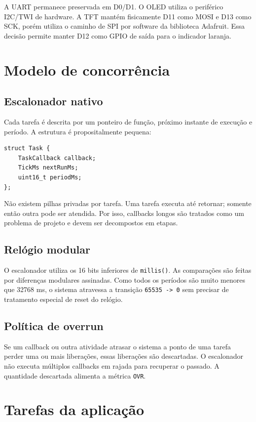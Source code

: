 \documentclass[12pt,a4paper]{article}
\begin{document}
A UART permanece preservada em D0/D1. O OLED utiliza o periférico I2C/TWI de
hardware. A TFT mantém fisicamente D11 como MOSI e D13 como SCK, porém utiliza o
caminho de SPI por software da biblioteca Adafruit. Essa decisão permite manter
D12 como GPIO de saída para o indicador laranja.

\section{Modelo de concorrência}

\subsection{Escalonador nativo}

Cada tarefa é descrita por um ponteiro de função, próximo instante de execução e
período. A estrutura é propositalmente pequena:

\begin{lstlisting}
struct Task {
    TaskCallback callback;
    TickMs nextRunMs;
    uint16_t periodMs;
};
\end{lstlisting}

Não existem pilhas privadas por tarefa. Uma tarefa executa até retornar; somente
então outra pode ser atendida. Por isso, callbacks longos são tratados como um
problema de projeto e devem ser decompostos em etapas.

\subsection{Relógio modular}

O escalonador utiliza os 16 bits inferiores de \texttt{millis()}. As comparações
são feitas por diferenças modulares assinadas. Como todos os períodos são muito
menores que 32768 ms, o sistema atravessa a transição \texttt{65535 -> 0} sem
precisar de tratamento especial de reset do relógio.

\subsection{Política de overrun}

Se um callback ou outra atividade atrasar o sistema a ponto de uma tarefa perder
uma ou mais liberações, essas liberações são descartadas. O escalonador não
executa múltiplos callbacks em rajada para recuperar o passado. A quantidade
descartada alimenta a métrica \texttt{OVR}.

\section{Tarefas da aplicação}
\end{document}
